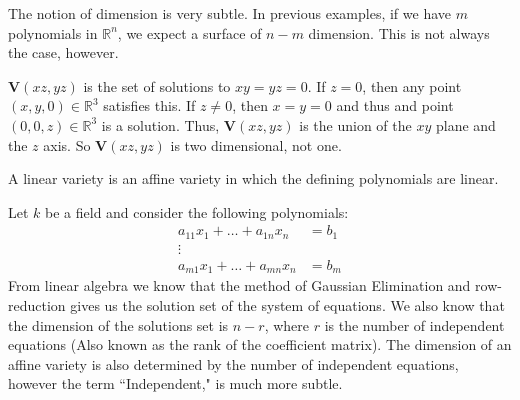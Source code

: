 \documentclass[crop=false,class=book,oneside]{standalone}
\begin{document}
                The notion of dimension is very subtle.
                In previous examples, if we have $m$ polynomials
                in $\mathbb{R}^n$, we expect a surface of $n-m$
                dimension. This is not always the case, however.
                \begin{example}
                    $\mathbf{V}(xz,yz)$ is the set of solutions
                    to $xy=yz=0$. If $z=0$, then any point
                    $(x,y,0)\in \mathbb{R}^3$ satisfies this.
                    If $z\ne 0$, then $x=y=0$ and thus and point
                    $(0,0,z)\in \mathbb{R}^3$ is a solution.
                    Thus, $\mathbf{V}(xz,yz)$ is the union of the $xy$
                    plane and the $z$ axis. So $\mathbf{V}(xz,yz)$
                    is two dimensional, not one.
                \end{example}
                \begin{definition}
                    A linear variety is an affine variety
                    in which the defining polynomials are linear.
                \end{definition}
                \begin{example}
                    Let $k$ be a field and consider
                    the following polynomials:
                    \begin{align*}
                        a_{11}x_{1}+\hdots+a_{1n}x_{n}
                        &=b_{1}\\
                        \vdots&\\
                        a_{m1}x_{1}+\hdots+a_{mn}x_{n}
                        &=b_{m}
                    \end{align*}
                    From linear algebra we know that the
                    method of Gaussian Elimination and
                    row-reduction gives us the solution set of the
                    system of equations. We also know that the
                    dimension of the solutions set is $n-r$, where $r$
                    is the number of independent equations
                    (Also known as the rank of the coefficient matrix).
                    The dimension of an affine variety is also
                    determined by the number of independent equations,
                    however the term ``Independent," is much more subtle.
                \end{example}
\end{document}
